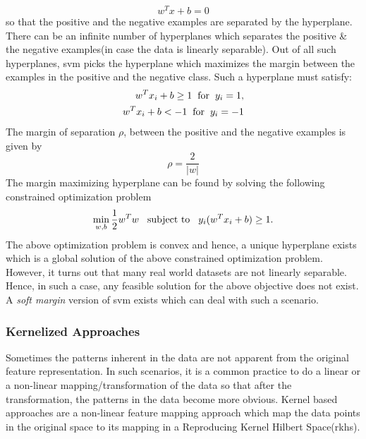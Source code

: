 \begin{equation}\label{eq_svm1}
w^Tx + b = 0
\end{equation}
so that the positive and the negative examples are separated by the hyperplane. There can be an infinite number of hyperplanes which separates the positive \& the negative examples(in case the data is linearly separable). Out of all such hyperplanes, {\sc svm} picks the hyperplane which maximizes the margin between the examples in the positive and the negative class.
Such a hyperplane must satisfy:
\begin{eqnarray}
w^Tx_i + b \geq 1 \hspace{.2cm} \mbox{for} \hspace{.2cm} y_i = 1, \\
w^Tx_i + b < -1 \hspace{.2cm} \mbox{for} \hspace{.2cm} y_i = -1 
\end{eqnarray}
The margin of separation $\rho$, between the positive and the negative examples is given by
\begin{equation}
\rho = \frac{2}{|w|}
\end{equation}
The margin maximizing hyperplane can be found by solving the following constrained optimization problem
\begin{equation}
\min_{w,b}\frac{1}{2}w^Tw \hspace{.3cm} \mbox{subject to} \hspace{.3cm} y_i(w^Tx_i + b) \geq 1.
\end{equation}
The above optimization problem is convex and hence, a unique hyperplane exists which is a global solution of the above constrained optimization problem. However, it turns out that many real world datasets are not linearly separable. Hence, in such a case, any feasible solution for the above objective does not exist. A \textit{soft margin} version of {\sc svm} exists which can deal with such a scenario.

\subsubsection{Kernelized Approaches}
\label{subsub_kernelized_approaches}
Sometimes the patterns inherent in the data are not apparent from the original feature representation. In such scenarios, it is a common practice to do a linear or a non-linear mapping/transformation of the data so that after the transformation, the patterns in the data become more obvious. Kernel based approaches are a non-linear feature mapping approach which map the data points in the original space to its mapping in a Reproducing Kernel Hilbert Space({\sc rkhs}).

